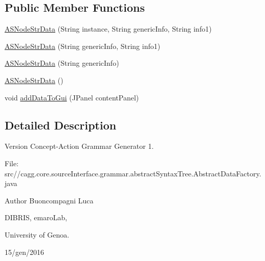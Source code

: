 \subsection*{Public Member Functions}
\begin{DoxyCompactItemize}
\item 
\hyperlink{classit_1_1emarolab_1_1cagg_1_1core_1_1language_1_1syntax_1_1abstractTree_1_1AbstractDataFactory_1_1ASNodeStrData_adedad2f214b32bc76b58112e013994d5}{A\-S\-Node\-Str\-Data} (String instance, String generic\-Info, String info1)
\item 
\hyperlink{classit_1_1emarolab_1_1cagg_1_1core_1_1language_1_1syntax_1_1abstractTree_1_1AbstractDataFactory_1_1ASNodeStrData_a02c0739885cf97ff97afad04163004ca}{A\-S\-Node\-Str\-Data} (String generic\-Info, String info1)
\item 
\hyperlink{classit_1_1emarolab_1_1cagg_1_1core_1_1language_1_1syntax_1_1abstractTree_1_1AbstractDataFactory_1_1ASNodeStrData_a8485301e7892b05ed42dcbceceb89f9f}{A\-S\-Node\-Str\-Data} (String generic\-Info)
\item 
\hyperlink{classit_1_1emarolab_1_1cagg_1_1core_1_1language_1_1syntax_1_1abstractTree_1_1AbstractDataFactory_1_1ASNodeStrData_a669d22a46171634f5f2a832fed9abcd5}{A\-S\-Node\-Str\-Data} ()
\item 
void \hyperlink{classit_1_1emarolab_1_1cagg_1_1core_1_1language_1_1syntax_1_1abstractTree_1_1AbstractDataFactory_1_1ASNodeStrData_a9bf39e0e9ce057ec36e5f6cac179cafd}{add\-Data\-To\-Gui} (J\-Panel content\-Panel)
\end{DoxyCompactItemize}


\subsection{Detailed Description}
\begin{DoxyVersion}{Version}
Concept-\/\-Action Grammar Generator 1. \par
 File\-: src//cagg.core.\-source\-Interface.\-grammar.\-abstract\-Syntax\-Tree.\-Abstract\-Data\-Factory.\-java \par

\end{DoxyVersion}
\begin{DoxyAuthor}{Author}
Buoncompagni Luca \par
 D\-I\-B\-R\-I\-S, emaro\-Lab,\par
 University of Genoa. \par
 15/gen/2016 \par

\end{DoxyAuthor}



